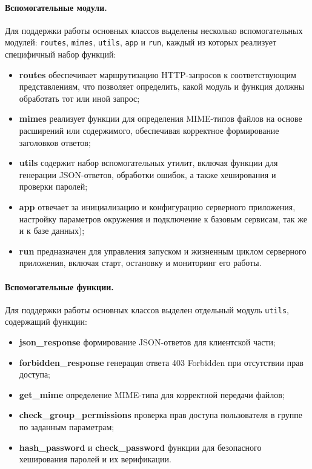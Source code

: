 \paragraph{Вспомогательные модули.}
Для поддержки работы основных классов выделены несколько вспомогательных модулей: \texttt{routes}, \texttt{mimes}, \texttt{utils}, \texttt{app} и \texttt{run}, каждый из которых реализует специфичный набор функций:
\begin{itemize}
	\item \textbf{routes} обеспечивает маршрутизацию HTTP-запросов к соответствующим представлениям, что позволяет определить, какой модуль и функция должны обработать тот или иной запрос;
	\item \textbf{mimes} реализует функции для определения MIME-типов файлов на основе расширений или содержимого, обеспечивая корректное формирование заголовков ответов;
	\item \textbf{utils} содержит набор вспомогательных утилит, включая функции для генерации JSON-ответов, обработки ошибок, а также хеширования и проверки паролей;
	\item \textbf{app} отвечает за инициализацию и конфигурацию серверного приложения, настройку параметров окружения и подключение к базовым сервисам, так же и к базе данных);
	\item \textbf{run} предназначен для управления запуском и жизненным циклом серверного приложения, включая старт, остановку и мониторинг его работы.
\end{itemize}


\paragraph{Вспомогательные функции.}
Для поддержки работы основных классов выделен отдельный модуль \texttt{utils}, содержащий функции:
\begin{itemize}
	\item \textbf{json\_response} формирование JSON-ответов для клиентской части;
	\item \textbf{forbidden\_response} генерация ответа 403 Forbidden при отсутствии прав доступа;
	\item \textbf{get\_mime} определение MIME-типа для корректной передачи файлов;
	\item \textbf{check\_group\_permissions} проверка прав доступа пользователя в группе по заданным параметрам;
	\item \textbf{hash\_password} и \textbf{check\_password} функции для безопасного хеширования паролей и их верификации.
\end{itemize}

